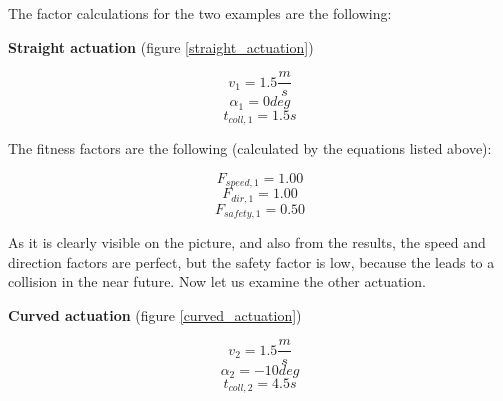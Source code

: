 \begin{minipage}{\textwidth}
The factor calculations for the two examples are the following:

\textbf{Straight actuation} (figure \ref{straight_actuation})

\[ v_{1} = 1.5 \frac{m}{s} \]
\[ \alpha_{1} = 0 deg \]
\[ t_{coll,1} = 1.5 s \]
\end{minipage}

\begin{minipage}{\textwidth}
The fitness factors are the following (calculated by the equations listed above):

\[ F_{speed,1} = 1.00 \]
\[ F_{dir,1} = 1.00 \]
\[ F_{safety,1} = 0.50 \]
\end{minipage}

As it is clearly visible on the picture, and also from the results, the speed and direction factors are perfect, but the safety factor is low, because the leads to a collision in the near future. Now let us examine the other actuation.

\begin{minipage}{\textwidth}
\textbf{Curved actuation} (figure \ref{curved_actuation})

\[ v_{2} = 1.5 \frac{m}{s} \]
\[ \alpha_{2} = -10 deg \]
\[ t_{coll,2} = 4.5 s \]
\end{minipage}

